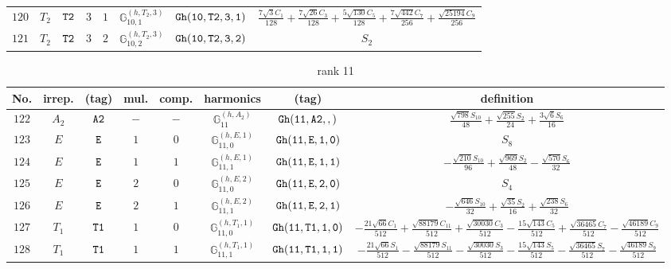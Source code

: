 \documentclass[fleqn,8pt]{jsarticle}
\begin{document}
\begin{table}[ht!]
\begin{center}
\begin{tabular}{cccccccc}
$ 120 $ & $ T_{2} $ & $ {\tt T2} $ & $ 3 $ & $ 1 $ & $ \mathbb{G}_{10,1}^{(h,T_{2},3)} $ & $ {\tt Gh(10,T2,3,1)} $ & $ \frac{7 \sqrt{3} C_{1}}{128} + \frac{7 \sqrt{26} C_{3}}{128} + \frac{5 \sqrt{130} C_{5}}{128} + \frac{7 \sqrt{442} C_{7}}{256} + \frac{\sqrt{25194} C_{9}}{256} $ \\
$ 121 $ & $ T_{2} $ & $ {\tt T2} $ & $ 3 $ & $ 2 $ & $ \mathbb{G}_{10,2}^{(h,T_{2},3)} $ & $ {\tt Gh(10,T2,3,2)} $ & $ S_{2} $ \\
 \hline \hline
\end{tabular}
\end{center}
\end{table}
\begin{table}[ht!]
\begin{center}
\caption{rank 11}
\renewcommand{\arraystretch}{1.3}
\begin{tabular}{cccccccc} \hline \hline
No. & irrep. & (tag) & mul. & comp. & harmonics & (tag) & definition \\ \hline
$ 122 $ & $ A_{2} $ & $ {\tt A2} $ & $ - $ & $ - $ & $ \mathbb{G}_{11}^{(h,A_{2})} $ & $ {\tt Gh(11,A2,,)} $ & $ \frac{\sqrt{798} S_{10}}{48} + \frac{\sqrt{255} S_{2}}{24} + \frac{3 \sqrt{6} S_{6}}{16} $ \\
$ 123 $ & $ E $ & $ {\tt E} $ & $ 1 $ & $ 0 $ & $ \mathbb{G}_{11,0}^{(h,E,1)} $ & $ {\tt Gh(11,E,1,0)} $ & $ S_{8} $ \\
$ 124 $ & $ E $ & $ {\tt E} $ & $ 1 $ & $ 1 $ & $ \mathbb{G}_{11,1}^{(h,E,1)} $ & $ {\tt Gh(11,E,1,1)} $ & $ - \frac{\sqrt{210} S_{10}}{96} + \frac{\sqrt{969} S_{2}}{48} - \frac{\sqrt{570} S_{6}}{32} $ \\
$ 125 $ & $ E $ & $ {\tt E} $ & $ 2 $ & $ 0 $ & $ \mathbb{G}_{11,0}^{(h,E,2)} $ & $ {\tt Gh(11,E,2,0)} $ & $ S_{4} $ \\
$ 126 $ & $ E $ & $ {\tt E} $ & $ 2 $ & $ 1 $ & $ \mathbb{G}_{11,1}^{(h,E,2)} $ & $ {\tt Gh(11,E,2,1)} $ & $ - \frac{\sqrt{646} S_{10}}{32} + \frac{\sqrt{35} S_{2}}{16} + \frac{\sqrt{238} S_{6}}{32} $ \\
$ 127 $ & $ T_{1} $ & $ {\tt T1} $ & $ 1 $ & $ 0 $ & $ \mathbb{G}_{11,0}^{(h,T_{1},1)} $ & $ {\tt Gh(11,T1,1,0)} $ & $ - \frac{21 \sqrt{66} C_{1}}{512} + \frac{\sqrt{88179} C_{11}}{512} + \frac{\sqrt{30030} C_{3}}{512} - \frac{15 \sqrt{143} C_{5}}{512} + \frac{\sqrt{36465} C_{7}}{512} - \frac{\sqrt{46189} C_{9}}{512} $ \\
$ 128 $ & $ T_{1} $ & $ {\tt T1} $ & $ 1 $ & $ 1 $ & $ \mathbb{G}_{11,1}^{(h,T_{1},1)} $ & $ {\tt Gh(11,T1,1,1)} $ & $ - \frac{21 \sqrt{66} S_{1}}{512} - \frac{\sqrt{88179} S_{11}}{512} - \frac{\sqrt{30030} S_{3}}{512} - \frac{15 \sqrt{143} S_{5}}{512} - \frac{\sqrt{36465} S_{7}}{512} - \frac{\sqrt{46189} S_{9}}{512} $ \\

\end{tabular}
\end{center}
\end{table}
\end{document}
